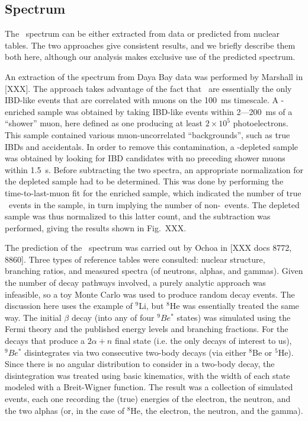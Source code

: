 \documentclass[../thesis.tex]{subfiles}
\begin{document}
\subsection{Spectrum}
\label{sec:bkgLi9Spectrum}

The \LiHe\ spectrum can be either extracted from data or predicted from nuclear
tables. The two approaches give consistent results, and we briefly describe them
both here, although our analysis makes exclusive use of the predicted spectrum.

An extraction of the spectrum from Daya Bay data was performed by Marshall in
[XXX]. The approach takes advantage of the fact that \LiHe\ are essentially the
only IBD-like events that are correlated with muons on the 100~ms timescale. A
\LiHe-enriched sample was obtained by taking IBD-like events within 2---200~ms
of a ``shower'' muon, here defined as one producing at least $2\times10^5$
photoelectrons. This sample contained various muon-uncorrelated ``backgrounds'',
such as true IBDs and accidentals. In order to remove this contamination, a
\LiHe-depleted sample was obtained by looking for IBD candidates with no
preceding shower muons within 1.5~s. Before subtracting the two spectra, an
appropriate normalization for the depleted sample had to be determined. This was
done by performing the time-to-last-muon fit for the enriched sample, which
indicated the number of true \LiHe\ events in the sample, in turn implying the
number of non-\LiHe\ events. The depleted sample was thus normalized to this
latter count, and the subtraction was performed, giving the results shown in
Fig.~XXX.

The prediction of the \LiHe\ spectrum was carried out by Ochoa in [XXX docs
8772, 8860]. Three types of reference tables were consulted: nuclear structure,
branching ratios, and measured spectra (of neutrons, alphas, and gammas). Given
the number of decay pathways involved, a purely analytic approach was
infeasible, so a toy Monte Carlo was used to produce random decay events. The
discussion here uses the example of $^9$Li, but $^8$He was essentially treated
the same way. The initial $\beta$ decay (into any of four $^9Be^*$ states) was
simulated using the Fermi theory and the published energy levels and branching
fractions. For the decays that produce a $2\alpha+n$ final state (i.e. the only
decays of interest to us), $^9Be^*$ disintegrates via two consecutive two-body
decays (via either $^8$Be or $^5$He). Since there is no angular distribution to
consider in a two-body decay, the disintegration was treated using basic
kinematics, with the width of each state modeled with a Breit-Wigner
function. The result was a collection of simulated events, each one recording
the (true) energies of the electron, the neutron, and the two alphas (or, in the
case of $^8$He, the electron, the neutron, and the gamma).
\end{document}
